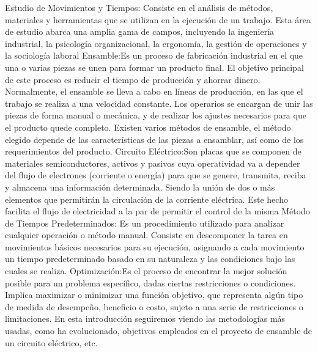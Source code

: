 Estudio de Movimientos y Tiempos: Consiste  en el análisis de métodos, materiales y herramientas que se utilizan en la ejecución de un trabajo. Esta área de estudio abarca una amplia gama de campos, incluyendo la ingeniería industrial, la psicología organizacional, la ergonomía, la gestión de operaciones y la sociología laboral
Ensamble:Es un proceso de fabricación industrial en el que una o varias piezas se unen para formar un producto final. El objetivo principal de este proceso es reducir el tiempo de producción y ahorrar dinero.
Normalmente, el ensamble se lleva a cabo en líneas de producción, en las que el trabajo se realiza a una velocidad constante. Los operarios se encargan de unir las piezas de forma manual o mecánica, y de realizar los ajustes necesarios para que el producto quede completo.
Existen varios métodos de ensamble, el método elegido depende de las características de las piezas a ensamblar, así como de los requerimientos del producto.
Circuito Eléctrico:Son placas que se componen de materiales semiconductores, activos y pasivos cuya operatividad va a depender del flujo de electrones (corriente o energía) para que se  genere, transmita, reciba y almacena una información determinada. Siendo  la unión de dos o más elementos que permitirán la circulación de la corriente eléctrica. Este hecho facilita el flujo de electricidad a la par de permitir el control de la misma
Método de Tiempos Predeterminados: Es un procedimiento utilizado para analizar cualquier operación o método manual. Consiste en descomponer la tarea en movimientos básicos necesarios para su ejecución, asignando a cada movimiento un tiempo predeterminado basado en su naturaleza y las condiciones bajo las cuales se realiza.
Optimización:Es el proceso de encontrar la mejor solución posible para un problema específico, dadas ciertas restricciones o condiciones. Implica maximizar o minimizar una función objetivo, que representa algún tipo de medida de desempeño, beneficio o costo, sujeto a una serie de restricciones o limitaciones. En esta introducción seguiremos viendo las metodologías más usadas, como ha evolucionado, objetivos empleados en el  proyecto de ensamble de un circuito eléctrico, etc.
